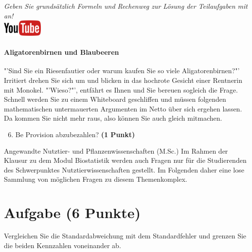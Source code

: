 \documentclass[a4paper, 9pt]{scrartcl}\usepackage[]{graphicx}\usepackage[]{xcolor}
\begin{document}
\textit{Geben Sie grunds{\"a}tzlich Formeln und Rechenweg zur L{\"o}sung der
  Teilaufgaben mit an!} \\[1Ex]

\hfill\href{https://youtu.be/SZqp_vy3rgI}{\includegraphics[width = 2cm]{img/youtube}} %
\hspace{2Ex}

\paragraph{Aligatorenbirnen und Blaubeeren}




"'Sind Sie ein Riesenfautier oder warum kaufen Sie so viele Aligatorenbirnen?"' Irritiert drehen Sie sich um und blicken in das hochrote Gesicht einer Rentnerin mit Monokel. "'Wieso?"', entfährt es Ihnen und Sie bereuen sogleich die Frage. Schnell werden Sie zu einem Whiteboard geschliffen und müssen folgenden mathematischen untermauerten Argumenten im Netto über sich ergehen lassen. Da kommen Sie nicht mehr raus, also können Sie auch gleich mitmachen.


\begin{enumerate}
  \setcounter{enumi}{5}
\item Be
  Provision abzubezahlen? \textbf{(1 Punkt)}
\end{enumerate} 
\clearpage
\begin{graybox}{Angewandte Nutztier- und Pflanzenwissenschaften (M.Sc.)}
  Im Rahmen der Klausur zu dem Modul Biostatistik werden auch Fragen
  nur für die Studierenden des Schwerpunktes Nutztierwissenschaften
  gestellt. Im Folgenden daher eine lose Sammlung von möglichen Fragen zu
  diesem Themenkomplex.
\end{graybox}
\clearpage

\section{Aufgabe \hfill (6 Punkte)}
Vergleichen Sie die Standardabweichung mit dem Standardfehler und grenzen
Sie die beiden Kennzahlen voneinander ab.
\end{document}

